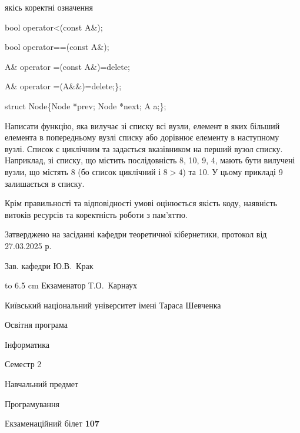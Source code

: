 \documentclass[12pt, ukrainian]{article}
\begin{document}
{\quad  якісь коректні означення 

\quad  bool operator<(const A\&); 

\quad  bool operator==(const A\&); 

\quad A\& operator =(const A\&)=delete; 

\quad  A\& operator =(A\&\&)=delete;\};

struct Node\{Node *prev; Node *next; A a;\};

Написати функцію, яка вилучає зі списку всі вузли, елемент в яких більший елемента в попередньому вузлі списку або дорівнює елементу в наступному вузлі. Список є циклічним та задається вказівником на перший вузол списку. Наприклад, зі списку, що містить послідовність 8, 10, 9, 4, мають бути вилучені вузли, що містять 8 (бо список циклічний і $8>4$) та 10. У цьому прикладі 9 залишається в списку.

Крім правильності та відповідності умові оцінюється якість коду, наявність витоків ресурсів та коректність роботи з пам'яттю. 

}
{\smallskip\smallskip \begin {scriptsize} Затверджено на засіданні кафедри теоретичної кібернетики, протокол   від   27.03.2025 р.\par\smallskip\smallskip\smallskip\smallskip
{\parbox {6.5 cm} {Зав. кафедри \dotfill Ю.В.~Крак}}\hspace {0.7cm} {\hbox to 6.5 cm { Екзаменатор \dotfill Т.О.~Карнаух}} \end{scriptsize}}
\newpage
{{\begin {scriptsize}\par
{ \center  Київський національний університет імені Тараса Шевченка \par}
{\parbox {5 cm}{Освітня програма \hfill}{\parbox {7 cm}{Інформатика\hfill}}\parbox {6 cm}{\hfill Семестр 2}}\par
{\parbox {5 cm} {Навчальний предмет \hfill}\parbox {7 cm}{Програмування \hfill}\parbox {6cm}{\hfill}\par}\vspace{-15pt} \end{scriptsize}}{\center Екзаменаційний білет \No \textbf { 107 }\par}}
\end{document}
